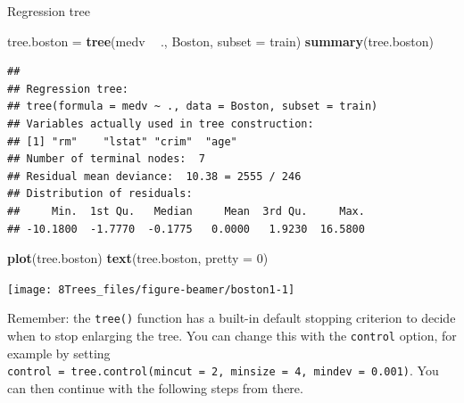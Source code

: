 \documentclass[10pt,ignorenonframetext,]{beamer}
\newenvironment{Shaded}{\begin{snugshade}}{\end{snugshade}}
\newcommand{\KeywordTok}[1]{\textcolor[rgb]{0.13,0.29,0.53}{\textbf{#1}}}
\newcommand{\DataTypeTok}[1]{\textcolor[rgb]{0.13,0.29,0.53}{#1}}
\newcommand{\DecValTok}[1]{\textcolor[rgb]{0.00,0.00,0.81}{#1}}
\newcommand{\StringTok}[1]{\textcolor[rgb]{0.31,0.60,0.02}{#1}}
\newcommand{\OperatorTok}[1]{\textcolor[rgb]{0.81,0.36,0.00}{\textbf{#1}}}
\newcommand{\NormalTok}[1]{#1}
\begin{document}
\begin{frame}[fragile]

\begin{block}{Regression tree}

\scriptsize

\begin{Shaded}
\begin{Highlighting}[]
\NormalTok{tree.boston =}\StringTok{ }\KeywordTok{tree}\NormalTok{(medv }\OperatorTok{~}\StringTok{ }\NormalTok{., Boston, }\DataTypeTok{subset =}\NormalTok{ train)}
\KeywordTok{summary}\NormalTok{(tree.boston)}
\end{Highlighting}
\end{Shaded}

\begin{verbatim}
## 
## Regression tree:
## tree(formula = medv ~ ., data = Boston, subset = train)
## Variables actually used in tree construction:
## [1] "rm"    "lstat" "crim"  "age"  
## Number of terminal nodes:  7 
## Residual mean deviance:  10.38 = 2555 / 246 
## Distribution of residuals:
##     Min.  1st Qu.   Median     Mean  3rd Qu.     Max. 
## -10.1800  -1.7770  -0.1775   0.0000   1.9230  16.5800
\end{verbatim}

\end{block}

\end{frame}

\begin{frame}[fragile]

\begin{Shaded}
\begin{Highlighting}[]
\KeywordTok{plot}\NormalTok{(tree.boston)}
\KeywordTok{text}\NormalTok{(tree.boston, }\DataTypeTok{pretty =} \DecValTok{0}\NormalTok{)}
\end{Highlighting}
\end{Shaded}

\begin{center}\texttt{[image: 8Trees\_files/figure-beamer/boston1-1]} \end{center}

\small
Remember: the \texttt{tree()} function has a built-in default stopping
criterion to decide when to stop enlarging the tree. You can change this
with the \texttt{control} option, for example by setting
\texttt{control\ =\ tree.control(mincut\ =\ 2,\ minsize\ =\ 4,\ mindev\ =\ 0.001)}.
You can then continue with the following steps from there.

\end{frame}
\end{document}
